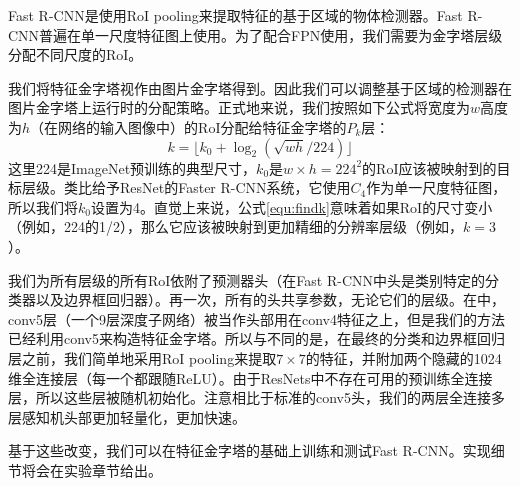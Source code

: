 \documentclass[../main.tex]{subfile}
\begin{document}
Fast R-CNN\cite{fastrcnn}是使用RoI pooling来提取特征的基于区域的物体检测器。Fast R-CNN普遍在单一尺度特征图上使用。为了配合FPN使用，我们需要为金字塔层级分配不同尺度的RoI。

我们将特征金字塔视作由图片金字塔得到。因此我们可以调整基于区域的检测器\cite{spp, fastrcnn}在图片金字塔上运行时的分配策略。正式地来说，我们按照如下公式将宽度为$w$高度为$h$（在网络的输入图像中）的RoI分配给特征金字塔的$P_k$层：
\begin{equation} \label{equ:findk}
    k = \lfloor k_0 + \log_2(\sqrt{wh}/224) \rfloor
\end{equation}
这里224是ImageNet预训练的典型尺寸，$k_0$是$w \times h=224^2$的RoI应该被映射到的目标层级。类比给予ResNet的Faster R-CNN\cite{rpn}系统，它使用$C_4$作为单一尺度特征图，所以我们将$k_0$设置为4。直觉上来说，公式\ref{equ:findk}意味着如果RoI的尺寸变小（例如，224的1/2），那么它应该被映射到更加精细的分辨率层级（例如，$k=3$）。

我们为所有层级的所有RoI依附了预测器头（在Fast R-CNN中头是类别特定的分类器以及边界框回归器）。再一次，所有的头共享参数，无论它们的层级。在\cite{resnet}中，conv5层（一个9层深度子网络）被当作头部用在conv4特征之上，但是我们的方法已经利用conv5来构造特征金字塔。所以与\cite{resnet}不同的是，在最终的分类和边界框回归层之前，我们简单地采用RoI pooling来提取$7\times 7$的特征，并附加两个隐藏的1024维全连接层（每一个都跟随ReLU）。由于ResNets中不存在可用的预训练全连接层，所以这些层被随机初始化。注意相比于标准的conv5头，我们的两层全连接多层感知机头部更加轻量化，更加快速。

基于这些改变，我们可以在特征金字塔的基础上训练和测试Fast R-CNN。实现细节将会在实验章节给出。
\end{document}
